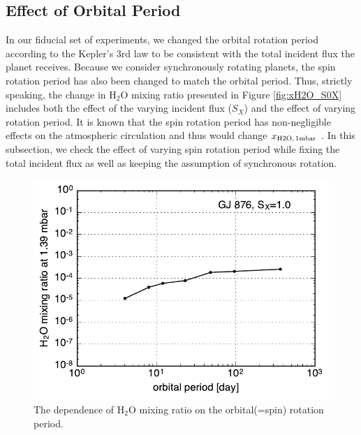 \documentclass[11pt,numberedappendix,twocolappendix,]{emulateapj}
\def\water{H$_2$O }
\def\xwater{$x_{\rm H2O,\,1mbar}$ }
\begin{document}
\subsection{Effect of Orbital Period}
\label{ss:sensitivity_Porbit}

In our fiducial set of experiments, we changed the orbital rotation period according to the Kepler's 3rd law to be consistent with the total incident flux the planet receives. 
Because we consider synchronously rotating planets, the spin rotation period has also been changed to match the orbital period. 
Thus, strictly speaking, the change in \water mixing ratio presented in Figure \ref{fig:xH2O_S0X} includes both the effect of the varying incident flux ($S_X$) and the effect of varying rotation period. 
It is known that the spin rotation period has non-negligible effects on the atmospheric circulation \citep{Yang2013, Kopparapu2016, Way2016} and thus would change \xwater. 
In this subsection, we check the effect of varying spin rotation period while fixing the total incident flux as well as keeping the assumption of synchronous rotation. 


\begin{figure}[!h]
    \begin{center}
    \includegraphics[width=\hsize]{fig/xH2O_Prot.pdf}
    \end{center}
\caption{The dependence of \water mixing ratio on the orbital(=spin) rotation period. }                                                                                                             
\label{fig:changeP}
\end{figure}
\end{document}
